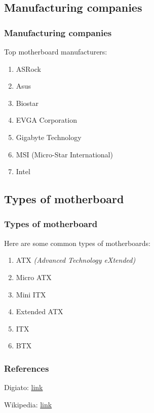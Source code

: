 \documentclass[
	12pt, %
]{beamer}
\begin{document}
\subsection{Manufacturing companies}

\begin{frame}
	\frametitle{Manufacturing companies}
	Top motherboard manufacturers:
	\begin{enumerate}
		\item ASRock
		\item Asus
		\item Biostar
		\item EVGA Corporation
		\item Gigabyte Technology
		\item MSI (Micro-Star International)
		\item Intel
	\end{enumerate}
\end{frame}


\subsection{Types of motherboard}

\begin{frame}
	\frametitle{Types of motherboard}
	Here are some common types of motherboards:
	\begin{enumerate}
		\item ATX \textit{(Advanced Technology eXtended)	}
		\item Micro ATX
		\item Mini ITX
		\item Extended ATX
		\item ITX
		\item BTX
	\end{enumerate}
\end{frame}


\begin{frame} %
	\frametitle{References}
	
	\begin{thebibliography}{99} %
		\footnotesize %
		
			Digiato: \href{https://digiato.com/}{link}
			
			Wikipedia: \href{https://www.wikipedia.org/}{link}
	\end{thebibliography}
\end{frame}
\end{document}
